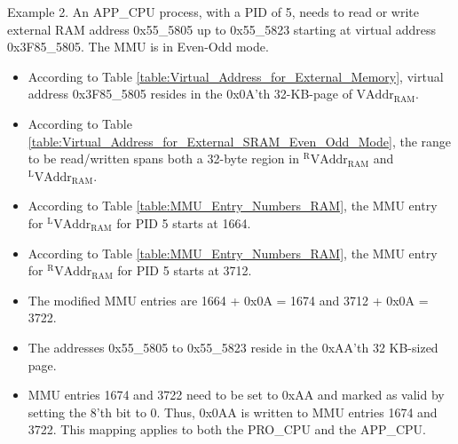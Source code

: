 Example 2. An APP\_CPU process, with a PID of 5, needs to read or write external RAM address 0x55\_5805 up to 0x55\_5823 starting at virtual address 0x3F85\_5805. The MMU is in Even-Odd mode.
\begin{itemize}
\itemsep-0.5em
\item According to Table \ref{table:Virtual_Address_for_External_Memory}, virtual address 0x3F85\_5805 resides in the 0x0A'th 32-KB-page of $\mathrm{VAddr}_{\mathrm{RAM}}$.
\item According to Table \ref{table:Virtual_Address_for_External_SRAM_Even_Odd_Mode}, the range to be read/written spans both a 32-byte region in $^{\mathrm{R}}\mathrm{VAddr}_{\mathrm{RAM}}$ and $^{\mathrm{L}}\mathrm{VAddr}_{\mathrm{RAM}}$.
\item According to Table \ref{table:MMU_Entry_Numbers_RAM}, the MMU entry for $^{\mathrm{L}}\mathrm{VAddr}_{\mathrm{RAM}}$ for PID 5 starts at 1664.
\item According to Table \ref{table:MMU_Entry_Numbers_RAM}, the MMU entry for $^{\mathrm{R}}\mathrm{VAddr}_{\mathrm{RAM}}$ for PID 5 starts at 3712.
\item The modified MMU entries are 1664 + 0x0A = 1674 and 3712 + 0x0A = 3722. 
\item The addresses 0x55\_5805 to 0x55\_5823 reside in the 0xAA'th 32 KB-sized page.
\item MMU entries 1674 and 3722 need to be set to 0xAA and marked as valid by setting the 8'th bit to 0. Thus, 0x0AA is written to MMU entries 1674 and 3722. This mapping applies to both the PRO\_CPU and the APP\_CPU.
\end{itemize}

